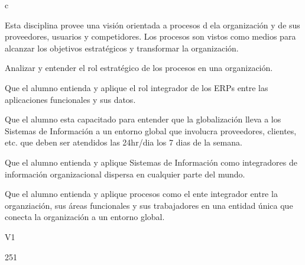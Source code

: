 c\begin{syllabus}


\begin{justification}
	Esta disciplina provee una visión orientada a procesos d ela organización y de sus proveedores, usuarios y competidores. Los procesos son vistos como medios para alcanzar los objetivos estratégicos y transformar la organización.
	\end{justification}
	
	\begin{goals}
	\item Analizar y entender el rol estratégico de los procesos en una organización.
	\item Que el alumno entienda y aplique el rol integrador de los ERPs entre las aplicaciones funcionales y sus datos.
	\item Que el alumno esta capacitado para entender que la globalización lleva a los Sistemas de Información a un entorno global que involucra proveedores, clientes, etc. que deben ser atendidos las 24hr/dia los 7 dias de la semana.
	\item Que el alumno entienda y aplique Sistemas de Información como integradores de información organizacional dispersa en cualquier parte del mundo.
	\item Que el alumno entienda y aplique procesos como el ente integrador entre la organziación, sus áreas funcionales y sus trabajadores en una entidad única que conecta la organización a un entorno global.
	\end{goals}
	
	\begin{outcomes}{V1}
		\item {}
		\item {}
		\item {}
		\item {}
		\item {}
	\end{outcomes}
	
	\begin{unit}{\LUTWOONEDef}{}{\LUTWOONEBib}{25}{1}
	   \begin{topics}
		   \item \OMCONETopicTWOxONExEIGHT
			\begin{subtopics}
				\item \OMCONETopicTWOxONExEIGHTxONE
				\item \OMCONETopicTWOxONExEIGHTxTWO
				\item \OMCONETopicTWOxONExEIGHTxTHREE
				\item \OMCONETopicTWOxONExEIGHTxFOUR
			\end{subtopics}
	   \end{topics}
		\LUTWOONEGoal
	\end{unit}
	

\end{syllabus}
